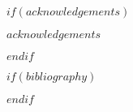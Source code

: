 \documentclass{aa}
\begin{document}
$if(acknowledgements)$
\begin{acknowledgements}
$acknowledgements$
\end{acknowledgements}
$endif$


%
%

$if(bibliography)$


$endif$

%
%
%
%
%
%
%
%
%
\end{document}
